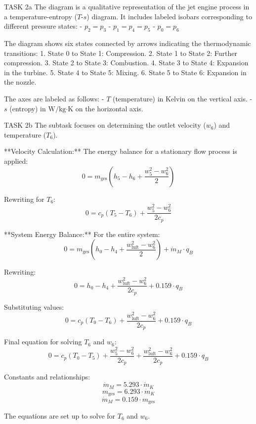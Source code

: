 TASK 2a  
The diagram is a qualitative representation of the jet engine process in a temperature-entropy (\( T \)-\( s \)) diagram. It includes labeled isobars corresponding to different pressure states:  
- \( p_2 = p_3 \)  
- \( p_1 = p_4 = p_5 \)  
- \( p_0 = p_6 \)  

The diagram shows six states connected by arrows indicating the thermodynamic transitions:  
1. State 0 to State 1: Compression.  
2. State 1 to State 2: Further compression.  
3. State 2 to State 3: Combustion.  
4. State 3 to State 4: Expansion in the turbine.  
5. State 4 to State 5: Mixing.  
6. State 5 to State 6: Expansion in the nozzle.  

The axes are labeled as follows:  
- \( T \) (temperature) in Kelvin on the vertical axis.  
- \( s \) (entropy) in \( \text{W}/\text{kg·K} \) on the horizontal axis.  

TASK 2b  
The subtask focuses on determining the outlet velocity (\( w_6 \)) and temperature (\( T_6 \)).  

**Velocity Calculation:**  
The energy balance for a stationary flow process is applied:  
\[
0 = m_{\text{ges}} \left( h_5 - h_6 + \frac{w_5^2 - w_6^2}{2} \right)
\]  

Rewriting for \( T_6 \):  
\[
0 = c_p \left( T_5 - T_6 \right) + \frac{w_5^2 - w_6^2}{2 c_p}
\]  

**System Energy Balance:**  
For the entire system:  
\[
0 = m_{\text{ges}} \left( h_0 - h_4 + \frac{w_{\text{luft}}^2 - w_6^2}{2} \right) + \dot{m}_M \cdot q_B
\]  

Rewriting:  
\[
0 = h_0 - h_4 + \frac{w_{\text{luft}}^2 - w_6^2}{2 c_p} + 0.159 \cdot q_B
\]  

Substituting values:  
\[
0 = c_p \left( T_0 - T_6 \right) + \frac{w_{\text{luft}}^2 - w_6^2}{2 c_p} + 0.159 \cdot q_B
\]  

Final equation for solving \( T_6 \) and \( w_6 \):  
\[
0 = c_p \left( T_0 - T_5 \right) + \frac{w_5^2 - w_6^2}{2 c_p} + \frac{w_{\text{luft}}^2 - w_6^2}{2 c_p} + 0.159 \cdot q_B
\]  

Constants and relationships:  
\[
\dot{m}_M = 5.293 \cdot \dot{m}_K  
\]  
\[
m_{\text{ges}} = 6.293 \cdot \dot{m}_K  
\]  
\[
\dot{m}_M = 0.159 \cdot m_{\text{ges}}  
\]  

The equations are set up to solve for \( T_6 \) and \( w_6 \).
